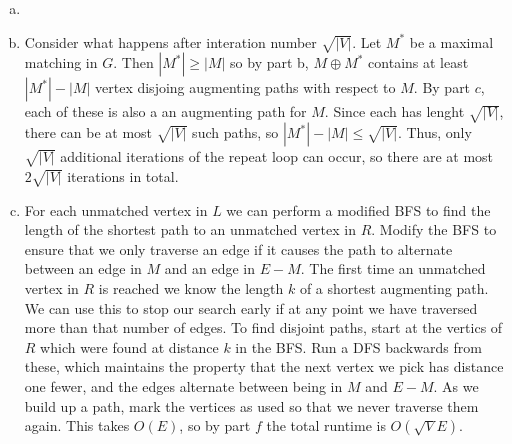 \documentclass{article}
\begin{document}
\begin{enumerate}[a.]
\item %


\item Consider what happens after interation number $\sqrt{|V|}$.  Let $M^*$ be a maximal matching in $G$.  Then $|M^*| \geq |M|$ so by part b, $M\oplus M^*$ contains at least $|M^*|-|M|$ vertex disjoing augmenting paths with respect to $M$. By part $c$, each of these is also a an augmenting path for $M$. Since each has lenght $\sqrt{|V|}$, there can be at most $\sqrt{|V|}$ such paths, so $|M^*|-|M| \leq \sqrt{|V|}$.  Thus, only $\sqrt{|V|}$ additional iterations of the repeat loop can occur, so there are at most $2\sqrt{|V|}$ iterations in total. 

\item For each unmatched vertex in $L$ we can perform a modified BFS to find the length of the shortest path to an unmatched vertex in $R$.  Modify the BFS to ensure that we only traverse an edge if it causes the path to alternate between an edge in $M$ and an edge in $E-M$.  The first time an unmatched vertex in $R$ is reached we know the length $k$ of a shortest augmenting path.  We can use this to stop our search early if at any point we have traversed more than that number of edges. To find disjoint paths, start at the vertics of $R$ which were found at distance $k$ in the BFS.  Run a DFS backwards from these, which maintains the property that the next vertex we pick has distance one fewer, and the edges alternate between being in $M$ and $E-M$. As we build up a path, mark the vertices as used so that we never traverse them again.  This takes $O(E)$, so by part $f$ the total runtime is $O(\sqrt{V}E)$. 
\end{enumerate}
\end{document}
